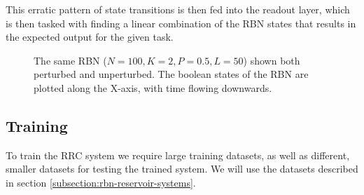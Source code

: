 This erratic pattern of state transitions is then fed into the readout layer,
which is then tasked with finding a linear combination of the RBN states that results in the expected output for the given task.

\begin{figure}
  \caption{
    The same RBN ($N=100, K=2, P=0.5, L=50$) shown both perturbed and unperturbed.
    The boolean states of the RBN are plotted along the X-axis,
    with time flowing downwards.
  }
\end{figure}

\subsection{Training}

To train the RRC system we require large training datasets,
as well as different, smaller datasets for testing the trained system.
We will use the datasets described in section \ref{subsection:rbn-reservoir-systems}.

